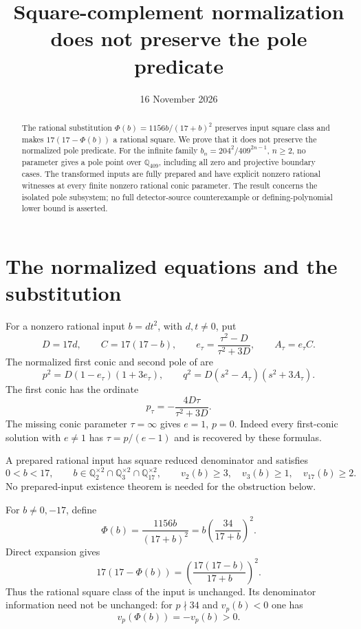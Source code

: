 \documentclass[11pt,a4paper]{article}
\title{Square-complement normalization does not preserve the pole predicate}
\author{}\date{16 November 2026}
\newcommand{\Q}{\mathbb Q}
\begin{document}
\maketitle
\begin{abstract}
The rational substitution $\Phi(b)=1156b/(17+b)^2$ preserves input
square class and makes $17(17-\Phi(b))$ a rational square. We prove that
it does not preserve the normalized pole predicate. For the infinite
family $b_n=204^2/409^{2n-1}$, $n\ge2$, no parameter gives a pole point
over $\Q_{409}$, including all zero and projective boundary cases.
The transformed inputs are fully prepared and have explicit nonzero
rational witnesses at every finite nonzero rational conic parameter. The result
concerns the isolated pole subsystem; no full detector-source
counterexample or defining-polynomial lower bound is asserted.
\end{abstract}

\section{The normalized equations and the substitution}

For a nonzero rational input $b=dt^2$, with $d,t\ne0$, put
\begin{equation}\label{eq:data}
 D=17d,\qquad C=17(17-b),\qquad
 e_\tau=\frac{\tau^2-D}{\tau^2+3D},\qquad A_\tau=e_\tau C.
\end{equation}
The normalized first conic and second pole of \cite{UnitNorm,Returns} are
\begin{equation}\label{eq:pole}
 p^2=D(1-e_\tau)(1+3e_\tau),\qquad
 q^2=D(s^2-A_\tau)(s^2+3A_\tau).
\end{equation}
The first conic has the ordinate
\begin{equation}\label{eq:p}
                    p_\tau=-\frac{4D\tau}{\tau^2+3D}.
\end{equation}
The missing conic parameter $\tau=\infty$ gives $e=1$, $p=0$.
Indeed every first-conic solution with $e\ne1$ has
$\tau=p/(e-1)$ and is recovered by these formulas.

A prepared rational input has square reduced denominator and satisfies
\[
 0<b<17,\qquad
 b\in\Q_2^{\times2}\cap\Q_3^{\times2}\cap\Q_{17}^{\times2},
 \qquad v_2(b)\ge3,\quad v_3(b)\ge1,\quad v_{17}(b)\ge2.
\]
No prepared-input existence theorem is needed for the obstruction below.

For $b\ne0,-17$, define
\begin{equation}\label{eq:phi}
 \Phi(b)=\frac{1156b}{(17+b)^2}
        =b\left(\frac{34}{17+b}\right)^2.
\end{equation}
Direct expansion gives
\begin{equation}\label{eq:square}
 17(17-\Phi(b))=
       \left(\frac{17(17-b)}{17+b}\right)^2.
\end{equation}
Thus the rational square class of the input is unchanged.
Its denominator information need not be unchanged: for $p\nmid34$
and $v_p(b)<0$ one has
\begin{equation}\label{eq:reverse}
                         v_p(\Phi(b))=-v_p(b)>0.
\end{equation}
\end{document}
